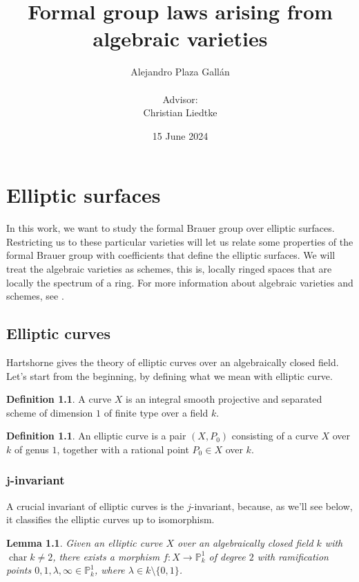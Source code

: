 \documentclass{report}
\title{Formal group laws arising from algebraic varieties}
\author{Alejandro Plaza Gall\'{a}n\\\\Advisor:\\Christian Liedtke}
\date{15 June 2024}
\DeclareMathOperator{\chara}{char}
\newtheorem{lemma}[theorem]{Lemma}
\theoremstyle{definition}
\newtheorem{definition}[theorem]{Definition}
\begin{document}
\maketitle

\tableofcontents
\newpage

\chapter{Elliptic surfaces}

In this work, we want to study the formal Brauer group over elliptic surfaces. Restricting us to these particular varieties will let us relate some properties of the formal Brauer group with coefficients that define the elliptic surfaces. We will treat the algebraic varieties as schemes, this is, locally ringed spaces that are locally the spectrum of a ring. For more information about algebraic varieties and schemes, see \cite{hartshorne2013algebraic}.

\section{Elliptic curves}

Hartshorne \cite[Section~IV.4]{hartshorne2013algebraic} gives the theory of elliptic curves over an algebraically closed field. Let's start from the beginning, by defining what we mean with elliptic curve.

\begin{definition}
A curve $X$ is an integral smooth projective and separated scheme of dimension $1$ of finite type over a field $k$.
\end{definition}

\begin{definition}
An elliptic curve is a pair $(X,P_0)$ consisting of a curve $X$ over $k$ of genus $1$, together with a rational point $P_0\in X$ over $k$.
\end{definition}

\subsection[\texorpdfstring{$j$}{j}-invariant]{\textbf{\texorpdfstring{$\boldsymbol{j}$}{j}-invariant}}

A crucial invariant of elliptic curves is the $j$-invariant, because, as we'll see below, it classifies the elliptic curves up to isomorphism.

\begin{lemma}
\label{Lem:lambdarama}
Given an elliptic curve $X$ over an algebraically closed field $k$ with $\chara k\neq2$, there exists a morphism $f:X\rightarrow\mathbb{P}_k^1$ of degree $2$ with ramification points $0,1,\lambda,\infty\in\mathbb{P}_k^1$, where $\lambda\in k\setminus\{0,1\}$.
\end{lemma}
\end{document}
